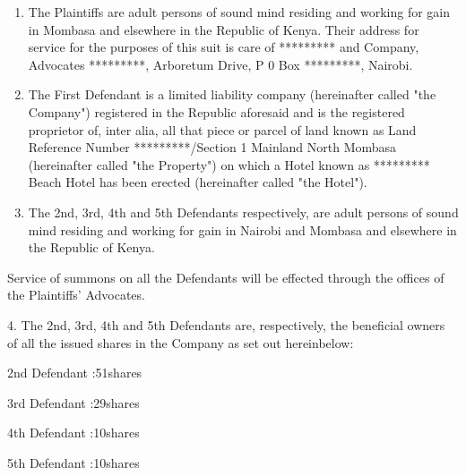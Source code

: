 \documentclass[12pt,a4paper]{article}
\begin{document}
\begin{enumerate}
\item The Plaintiffs are adult persons of sound mind residing and working for gain in Mombasa and elsewhere in the Republic of Kenya.  Their address for service for the purposes of this suit is care of ********* and Company, Advocates *********, Arboretum Drive, P 0 Box *********, Nairobi.

\item The First Defendant is a limited liability company (hereinafter called "the Company") registered in the Republic aforesaid and is the registered proprietor of, inter alia, all that piece or parcel of land known as Land Reference Number *********/Section 1 Mainland North Mombasa (hereinafter called "the Property") on which a Hotel known as ********* Beach Hotel has been erected (hereinafter called "the Hotel").

\item The 2nd, 3rd, 4th and 5th Defendants respectively, are adult persons of sound mind residing and working for gain in Nairobi and Mombasa and elsewhere in the Republic of Kenya.     

\end{enumerate}
\begin{justify}   Service of summons on all the Defendants will be effected through the       offices of the Plaintiffs' Advocates.\end{justify}


\begin{justify}4.      The 2nd, 3rd, 4th and 5th Defendants are, respectively, the beneficial owners               of all the issued shares in the Company as set out hereinbelow:\end{justify}


\begin{justify}2nd Defendant                        :51shares\end{justify}


\begin{justify}3rd Defendant                        :29shares\end{justify}


\begin{justify}4th Defendant                        :10shares\end{justify}


\begin{justify}5th Defendant                        :10shares\end{justify}
\end{document}
